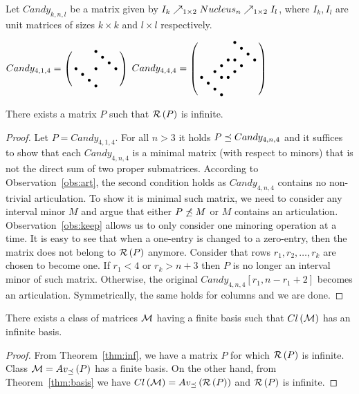 \begin{defn}
Let $Candy_{k,n,l}$ be a matrix given by $I_k\nearrow_{1\times2}Nucleus_n\nearrow_{1\times2}I_l$, where $I_k,I_l$ are unit matrices of sizes $k\times k$ and $l\times l$ respectively.
\end{defn}
$Candy_{4,1,4}=\left(\begin{smallmatrix}
 & & &\bullet& & & \\
 & & & &\bullet& & \\
 & & & & &\bullet& \\
\bullet& & &\bullet& & &\bullet\\
 &\bullet& & & & & \\
 & &\bullet& & & & \\
 & & &\bullet& & & \end{smallmatrix}\right)$
$Candy_{4,4,4}=\left(\begin{smallmatrix}
 & & & & &\bullet& & & \\
 & & & & & &\bullet& & \\
 & & & & & & &\bullet& \\
 & & & & \bullet&\bullet& & &\bullet\\
 & & &\bullet& & &\bullet& & \\
 & & \bullet& & &\bullet& & & \\
\bullet& & &\bullet&\bullet& & & & \\
 &\bullet& & & & & & & \\
 & &\bullet& & & & & & \\
 & & &\bullet& & & & & \end{smallmatrix}\right)$

\begin{thm}
\label{thm:inf}
There exists a matrix $P$ such that $\mathcal{R}\left(P\right)$ is infinite.
\end{thm}
\begin{proof}
Let $P=Candy_{4,1,4}$. For all $n>3$ it holds $P\preceq Candy_{4,n,4}$ and it suffices to show that each $Candy_{4,n,4}$ is a minimal matrix (with respect to minors) that is not the direct sum of two proper submatrices. According to Observation~\ref{obs:art}, the second condition holds as $Candy_{4,n,4}$ contains no non-trivial articulation. To show it is minimal such matrix, we need to consider any interval minor $M$ and argue that either $P\not\preceq M$ or $M$ contains an articulation. Observation~\ref{obs:keep} allows us to only consider one minoring operation at a time. It is easy to see that when a one-entry is changed to a zero-entry, then the matrix does not belong to $\mathcal{R}\left(P\right)$ anymore. Consider that rows $r_1,r_2,\dots,r_k$ are chosen to become one. If $r_1<4$ or $r_k>n+3$ then $P$ is no longer an interval minor of such matrix. Otherwise, the original $Candy_{4,n,4}[r_1,n-r_1+2]$ becomes an articulation. Symmetrically, the same holds for columns and we are done.
\end{proof}

\begin{cor}
There exists a class of matrices $\mathcal{M}$ having a finite basis such that $Cl\left(\mathcal{M}\right)$ has an infinite basis.
\end{cor}
\begin{proof}
From Theorem~\ref{thm:inf}, we have a matrix $P$ for which $\mathcal{R}\left(P\right)$ is infinite. Class $\mathcal{M}=Av_{\preceq}\left(P\right)$ has a finite basis. On the other hand, from Theorem~\ref{thm:basis} we have $Cl\left(\mathcal{M}\right)=Av_{\preceq}\left(\mathcal{R}\left(P\right)\right)$ and $\mathcal{R}\left(P\right)$ is infinite.
\end{proof}